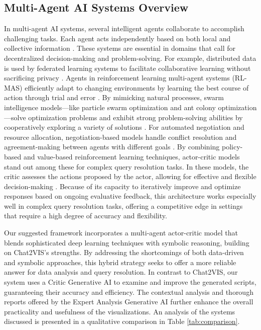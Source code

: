 \subsection{Multi-Agent AI Systems Overview} In multi-agent AI systems, several intelligent agents collaborate to accomplish challenging tasks. Each agent acts independently based on both local and collective information \cite{wooldridge2009introduction}. These systems are essential in domains that call for decentralized decision-making and problem-solving. For example, distributed data is used by federated learning systems to facilitate collaborative learning without sacrificing privacy \mbox{\cite{konevcny2016federated}}. Agents in reinforcement learning multi-agent systems (RL-MAS) efficiently adapt to changing environments by learning the best course of action through trial and error \mbox{\cite{busoniu2008comprehensive}}. By mimicking natural processes, swarm intelligence models—like particle swarm optimization and ant colony optimization—solve optimization problems and exhibit strong problem-solving abilities by cooperatively exploring a variety of solutions \mbox{\cite{kennedy1995particle, dorigo2019ant}}. For automated negotiation and resource allocation, negotiation-based models handle conflict resolution and agreement-making between agents with different goals \mbox{\cite{kraus1997negotiation, fatima2002multi}}. By combining policy-based and value-based reinforcement learning techniques, actor-critic models stand out among these for complex query resolution tasks. In these models, the critic assesses the actions proposed by the actor, allowing for effective and flexible decision-making \mbox{\cite{konda2000actor}}. Because of its capacity to iteratively improve and optimize responses based on ongoing evaluative feedback, this architecture works especially well in complex query resolution tasks, offering a competitive edge in settings that require a high degree of accuracy and flexibility.

Our suggested framework incorporates a multi-agent actor-critic model that blends sophisticated deep learning techniques with symbolic reasoning, building on Chat2VIS's strengths. By addressing the shortcomings of both data-driven and symbolic approaches, this hybrid strategy seeks to offer a more reliable answer for data analysis and query resolution. In contrast to Chat2VIS, our system uses a Critic Generative AI to examine and improve the generated scripts, guaranteeing their accuracy and efficiency. The contextual analysis and thorough reports offered by the Expert Analysis Generative AI further enhance the overall practicality and usefulness of the visualizations. An analysis of the systems discussed is presented in a qualitative comparison in Table \ref{tab:comparison}.